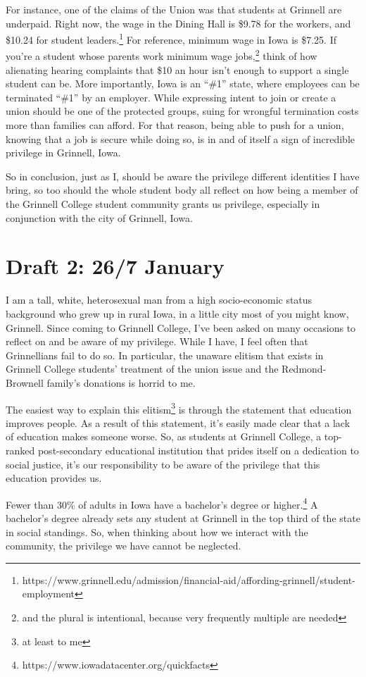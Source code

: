 \documentclass[12pt]{article}[titlepage]
\newcommand{\say}[1]{``\#1''}
\newcommand{\1}{\={a}}
\newcommand{\2}{\={e}}
\newcommand{\3}{\={\i}}
\newcommand{\4}{\=o}
\newcommand{\5}{\=u}
\newcommand{\6}{\={A}}
\renewcommand{\,}{\textsuperscript{,}}
\begin{document}
For instance, one of the claims of the Union was that students at Grinnell are underpaid.
Right now, the wage in the Dining Hall is \$9.78 for the workers, and \$10.24 for student leaders.\footnote{https://www.grinnell.edu/admission/financial-aid/affording-grinnell/student-employment}
For reference, minimum wage in Iowa is \$7.25.
If you're a student whose parents work minimum wage jobs,\footnote{and the plural is intentional, because very frequently multiple are needed} think of how alienating hearing complaints that \$10 an hour isn't enough to support a single student can be.
More importantly, Iowa is an \say{at-will} state, where employees can be terminated \say{at will} by an employer.
While expressing intent to join or create a union should be one of the protected groups, suing for wrongful termination costs more than families can afford.
For that reason, being able to push for a union, knowing that a job is secure while doing so, is in and of itself a sign of incredible privilege in Grinnell, Iowa.

So in conclusion, just as I, should be aware the privilege different identities I have bring, so too should the whole student body all reflect on how being a member of the Grinnell College student community grants us privilege, especially in conjunction with the city of Grinnell, Iowa.
\section{Draft 2: 26/7 January}
I am a tall, white, heterosexual man from a high socio-economic status background who grew up in rural Iowa, in a little city most of you might know, Grinnell.
Since coming to Grinnell College, I've been asked on many occasions to reflect on and be aware of my privilege.
While I have, I feel often that Grinnellians fail to do so.
In particular, the unaware elitism that exists in Grinnell College students' treatment of the union issue and the Redmond-Brownell family's donations is horrid to me.

The easiest way to explain this elitism\footnote{at least to me} is through the statement that education improves people.
As a result of this statement, it's easily made clear that a lack of education makes someone worse.
So, as students at Grinnell College, a top-ranked post-secondary educational institution that prides itself on a dedication to social justice, it's our responsibility to be aware of the privilege that this education provides us.

Fewer than 30\% of adults in Iowa have a bachelor's degree or higher.\footnote{https://www.iowadatacenter.org/quickfacts}
A bachelor's degree already sets any student at Grinnell in the top third of the state in social standings.
So, when thinking about how we interact with the community, the privilege we have cannot be neglected.
\end{document}
